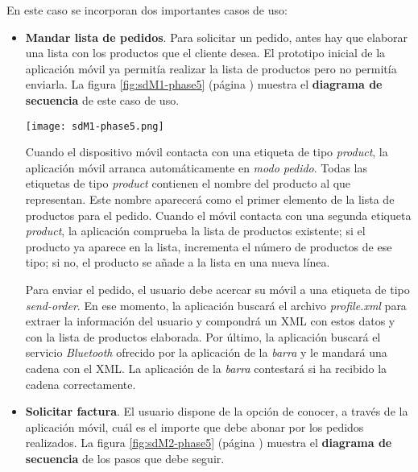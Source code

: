 En este caso se incorporan dos importantes casos de uso:
\begin{itemize}
\item \textbf{Mandar lista de pedidos}. Para solicitar un pedido, antes hay
que elaborar una lista con los productos que el cliente desea. El prototipo
inicial de la aplicación móvil ya permitía realizar la lista de productos
pero no permitía enviarla. La figura \ref{fig:sdM1-phase5} (página
\pageref{fig:sdM1-phase5}) muestra el \textbf{diagrama de secuencia} de este
caso de uso.

  \begin{sidewaysfigure}[h]
    \begin{center}
      \texttt{[image: sdM1-phase5.png]}
      \caption{Diagrama de secuencia del caso de uso \emph{mandar lista
      de pedidos}. En este caso el cliente solicita dos productos.}
      \label{fig:sdM1-phase5}
    \end{center}
  \end{sidewaysfigure}

Cuando el dispositivo móvil contacta con una etiqueta de tipo \emph{product},
la aplicación móvil arranca automáticamente en \emph{modo pedido}. Todas las
etiquetas de tipo \emph{product} contienen el nombre del producto al que
representan. Este nombre aparecerá como el primer elemento de la lista de
productos para el pedido. Cuando el móvil contacta con una segunda etiqueta
\emph{product}, la aplicación comprueba la lista de productos existente; si
el producto ya aparece en la lista, incrementa el número de productos de ese
tipo; si no, el producto se añade a la lista en una nueva línea.

Para enviar el pedido, el usuario debe acercar su móvil a una etiqueta de
tipo \emph{send-order}. En ese momento, la aplicación buscará el archivo
\emph{profile.xml} para extraer la información del usuario y compondrá un
\acs{XML} con estos datos y con la lista de productos elaborada. Por último,
la aplicación buscará el servicio \emph{Bluetooth} ofrecido por la aplicación
de la \emph{barra} y le mandará una cadena con el \acs{XML}. La aplicación
de la \emph{barra} contestará si ha recibido la cadena correctamente.

\item \textbf{Solicitar factura}. El usuario dispone de la opción de conocer,
a través de la aplicación móvil, cuál es el importe que debe abonar por los
pedidos realizados. La figura \ref{fig:sdM2-phase5} (página
\pageref{fig:sdM2-phase5}) muestra el \textbf{diagrama de secuencia} de los
pasos que debe seguir.


\end{itemize}
